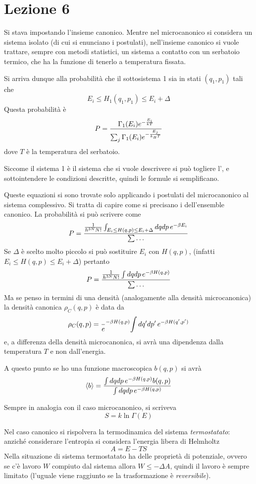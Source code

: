 \documentclass[../MeccanicaStatistica.tex]{subfiles}
\begin{document}
\section{Lezione 6}
Si stava impostando l'insieme canonico. Mentre nel microcanonico si considera un sistema isolato (di cui si enunciano i postulati), nell'insieme canonico si vuole trattare, sempre con metodi statistici, un sistema a contatto con un serbatoio termico, che ha la funzione di tenerlo a temperatura fissata.

Si arriva dunque alla probabilità che il sottosistema 1 sia in stati $(q_1, p_1)$ tali che 
\[
E_i \le H_1(q_1,p_1) \le E_i + \Delta
\]
Questa probabilità è
\[
P = \frac{\Gamma_1(E_i) e^{-\frac{E_i}{kT}}}{\sum_j \Gamma_1(E_i) e^{-\frac{E_j}{k_B T}}}
\]
dove $T$ è la temperatura del serbatoio.

Siccome il sistema 1 è il sistema che si vuole descrivere si può togliere l', e sottointendere le condizioni descritte, quindi le formule si semplificano.

Queste equazioni si sono trovate solo applicando i postulati del microcanonico al sistema complessivo. Si tratta di capire come si precisano i  dell'ensemble canonico. La probabilità si può scrivere come
\[
P = \frac{\frac{1}{h^{3N} N!} \int_{E_i \le H(q,p) \le E_i + \Delta} d q d p \, e^{- \beta E_i}}{\sum \dots}
\]
Se $\Delta$ è scelto molto piccolo si può sostituire $E_i$ con $H(q,p)$, (infatti $E_i \le H(q,p) \le E_i + \Delta$) pertanto
\[
P = \frac{\frac{1}{h^{3N} N!} \int d q d p \, e^{- \beta H(q,p)}}{\sum \dots}
\]
Ma se penso in termini di una densità (analogamente alla densità microcanonica) la densità canonica $\rho_C(q,p)$ è data da
\[
\rho_C(q,p) = \frac{}e^{- \beta H(q,p)}{\int d q' d p' \, e^{-\beta H(q',p')}}
\]
e, a differenza della densità microcanonica, si avrà una dipendenza dalla temperatura $T$ e non dall'energia.

A questo punto se ho una funzione macroscopica $b(q,p)$ si avrà
\[
\left\langle{b}\right\rangle = \frac{\int d q d p \, e^{- \beta H(q,p)} b(q,p)}{\int d q d p \, e^{- \beta H(q,p)}}
\]

Sempre in analogia con il caso microcanonico, si scriveva
\[
S = k \ln\Gamma(E)
\]

Nel caso canonico si rispolvera la termodinamica del sistema \emph{termostatato}: anziché considerare l'entropia si considera l'energia libera di Helmholtz
\[
A = E - TS
\]
Nella situazione di sistema termostatato ha delle proprietà di potenziale, ovvero se c'è lavoro $W$ compiuto dal sistema allora $W \le - \Delta A$, quindi il lavoro è sempre limitato (l'uguale viene raggiunto se la trasformazione è \emph{reversibile}).
\end{document}
